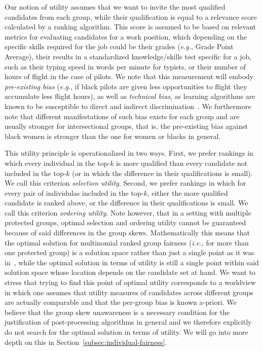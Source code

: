 Our notion of utility assumes that we want to invite the most qualified candidates from each group, while their qualification is equal to a relevance score calculated by a ranking algorithm.
%
This score is assumed to be based on relevant metrics for evaluating candidates for a work position, which depending on the specific skills required for the job could be their grades ({\em e.g.}, Grade Point Average), their results in a standardized knowledge/skills test specific for a job, such as their typing speed in words per minute for typists, or their number of hours of flight in the case of pilots.
%
We note that this measurement will embody \emph{pre-existing bias} ({\em e.g.}, if black pilots are given less opportunities to flight they accumulate less flight hours), as well as \emph{technical bias}, as learning algorithms are known to be susceptible to direct and indirect discrimination~\cite{tuto2016,HajianFerrer12}.
%
We furthermore note that different manifestations of such bias exists for each group and are usually stronger for intersectional groups, that is, the pre-existing bias against black women is stronger than the one for women or blacks in general.
%

This utility principle is operationalized in two ways.
%
First, we prefer rankings in which every individual in the top-$k$ is more qualified than every candidate not included in the top-$k$ (or in which the difference in their qualifications is small). We call this criterion \emph{selection utility}.
%
Second, we prefer rankings in which for every pair of individulas included in the top-$k$, either the more qualified candidate is ranked above, or the difference in their qualifications is small. We call this criterion \emph{ordering utility}.
%
Note however, that in a setting with multiple protected groups, optimal selection and ordering utility cannot be guaranteed because of said differences in the group skews.
%
Mathematically this means that the optimal solution for multinomial ranked group fairness ({\em i.e.}, for more than one protected group) is a solution space rather than just a single point as it was in~\cite{zehlike2017fair}, while the optimal solution in terms of utility is still a single point within said solution space whose location depends on the candidate set at hand.
%
We want to stress that trying to find this point of optimal utility corresponds to a worldview in which one assumes that utility measures of candidates across different groups are actually comparable and that the per-group bias is known a-priori.
%
We believe that the group skew unawareness is a necessary condition for the justification of post-processing algorithms in general and we therefore explicitly do not search for the optimal solution in terms of utility.
%
We will go into more depth on this in Section~\ref{subsec:individual-fairness}.
%

